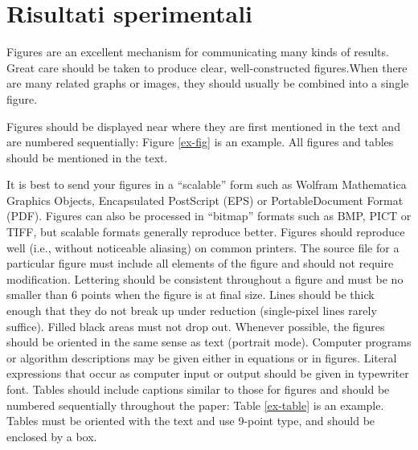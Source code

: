 \documentclass{article}
\begin{document}


\section{Risultati sperimentali}

Figures are an excellent mechanism for communicating many kinds of results. Great care should be taken to produce clear, well-constructed figures.When there are many related graphs or images, they should usually be combined into a single figure. 

Figures should be displayed near where they are first mentioned in the text and are numbered sequentially: Figure \ref{ex-fig} is an example. All figures and tables should be mentioned in the text.

It is best to send your figures in a {``}scalable{''} form such as Wolfram Mathematica Graphics Objects, Encapsulated PostScript (EPS) or PortableDocument Format (PDF). Figures can also be processed in {``}bitmap{''} formats such as BMP, PICT or TIFF, but scalable formats generally reproduce better.
Figures should reproduce well (i.e., without noticeable aliasing) on common printers. The source file for a particular figure must include all elements of the figure and should not require modification. Lettering should be consistent throughout a figure and must be no smaller than 6 points when the figure is at final size. Lines should be thick enough that they do not break up under reduction (single-pixel lines rarely suffice). Filled black areas must not drop out. Whenever possible, the figures should be oriented in the same sense as text (portrait mode). 
Computer programs or algorithm descriptions may be given either in equations or in figures. Literal expressions that occur as computer input or output should be given in typewriter font. 
Tables should include captions similar to those for figures and should be numbered sequentially throughout the paper: Table \ref{ex-table} is an example. Tables must be oriented with the text and use 9-point type, and should be enclosed by a box. 
\end{document}
